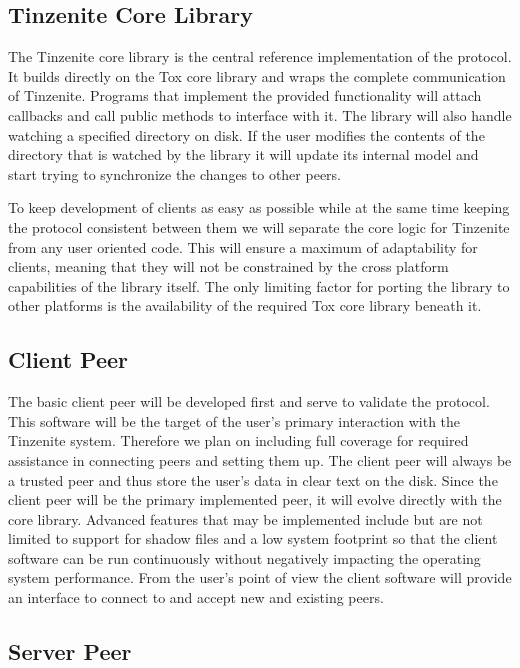 \subsection{Tinzenite Core Library}
\label{sub:Tinzenite Core Library}

The Tinzenite core library is the central reference implementation of the protocol.
It builds directly on the Tox core library and wraps the complete communication of Tinzenite.
Programs that implement the provided functionality will attach callbacks and call public methods to interface with it.
The library will also handle watching a specified directory on disk.
If the user modifies the contents of the directory that is watched by the library it will update its internal model and start trying to synchronize the changes to other peers.

To keep development of clients as easy as possible while at the same time keeping the protocol consistent between them we will separate the core logic for Tinzenite from any user oriented code.
This will ensure a maximum of adaptability for clients, meaning that they will not be constrained by the cross platform capabilities of the library itself.
The only limiting factor for porting the library to other platforms is the availability of the required Tox core library beneath it.

\subsection{Client Peer}

The basic client peer will be developed first and serve to validate the protocol.
This software will be the target of the user's primary interaction with the Tinzenite system.
Therefore we plan on including full coverage for required assistance in connecting peers and setting them up.
The client peer will always be a trusted peer and thus store the user's data in clear text on the disk.
Since the client peer will be the primary implemented peer, it will evolve directly with the core library.
Advanced features that may be implemented include but are not limited to support for shadow files and a low system footprint so that the client software can be run continuously without negatively impacting the operating system performance.
From the user's point of view the client software will provide an interface to connect to and accept new and existing peers.

\subsection{Server Peer}

